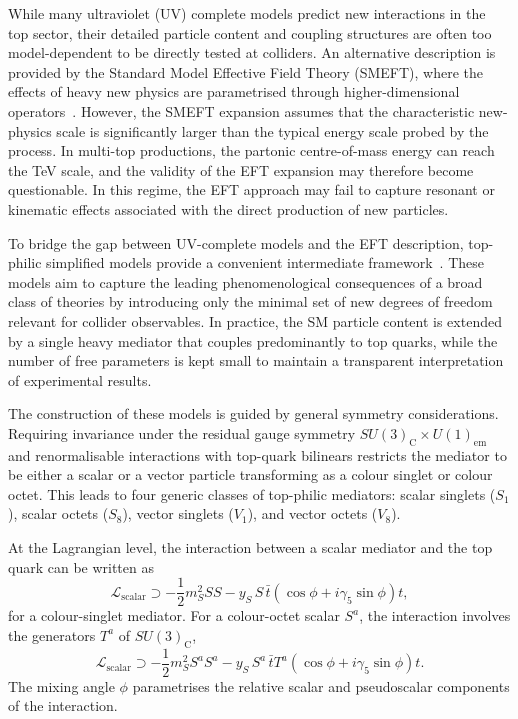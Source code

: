 While many ultraviolet (UV) complete models predict new interactions in the~\cite{BattagliaServant2010FourTop,LillieShuTait2008TopCompositeness,Gerbush2008ColorOctet,SalamStrathdee1975SUSYFermionNumber}
top sector, their detailed particle content and coupling structures are often 
too model-dependent to be directly tested at colliders. 
An alternative description is provided by the Standard Model Effective Field 
Theory (SMEFT), where the effects of heavy new physics are parametrised through 
higher-dimensional operators~\cite{Agram2013TopAnomalous,DHondt2018PinpointOperators,Banelli2021FourTopOperators}. 
However, the SMEFT expansion assumes that the characteristic new-physics scale 
is significantly larger than the typical energy scale probed by the process. 
In multi-top productions, the partonic centre-of-mass energy can reach the 
TeV scale, and the validity of the EFT expansion may therefore become questionable. 
In this regime, the EFT approach may fail to capture resonant or kinematic 
effects associated with the direct production of new particles.

To bridge the gap between UV-complete models and the EFT description, 
top-philic simplified models provide a convenient intermediate framework~\cite{Darme:2021gtt}. 
These models aim to capture the leading phenomenological consequences of a 
broad class of theories by introducing only the minimal set of new degrees of 
freedom relevant for collider observables. 
In practice, the SM particle content is extended by a single heavy mediator 
that couples predominantly to top quarks, while the number of free parameters 
is kept small to maintain a transparent interpretation of experimental results.

The construction of these models is guided by general symmetry considerations. 
Requiring invariance under the residual gauge symmetry 
$SU(3)_\mathrm{C} \times U(1)_\mathrm{em}$ and renormalisable interactions 
with top-quark bilinears restricts the mediator to be either a scalar or a 
vector particle transforming as a colour singlet or colour octet. 
This leads to four generic classes of top-philic mediators: scalar singlets 
($S_1$), scalar octets ($S_8$), vector singlets ($V_1$), and vector octets ($V_8$).

At the Lagrangian level, the interaction between a scalar mediator and the 
top quark can be written as
\begin{equation}
\mathcal{L}_{\text{scalar}} \supset
-\frac{1}{2} m_S^2 S S
- y_S\, S\, \bar{t}\left(\cos\phi + i\gamma_5\sin\phi\right)t ,
\end{equation}
for a colour-singlet mediator. 
For a colour-octet scalar $S^a$, the interaction involves the generators 
$T^a$ of $SU(3)_\mathrm{C}$,
\begin{equation}
\mathcal{L}_{\text{scalar}} \supset
-\frac{1}{2} m_S^2 S^a S^a
- y_S\, S^a\, \bar{t}T^a\left(\cos\phi + i\gamma_5\sin\phi\right)t .
\end{equation}
The mixing angle $\phi$ parametrises the relative scalar and pseudoscalar 
components of the interaction.

